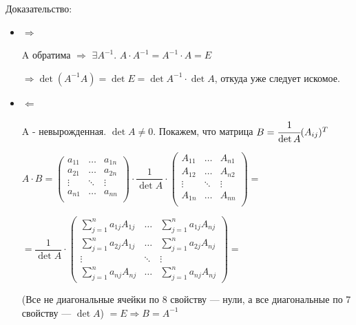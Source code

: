 \documentclass[twoside]{book}
\begin{document}
Доказательство:
\begin{itemize}
    \item \(\Rightarrow\)

          A обратима \(\Rightarrow\) \(\exists  A^{-1}\). \( A \cdot    A^{-1}  =  A^{-1} \cdot A = E \)

          \(\Rightarrow \det( A^{-1} A) =\det E = \det A^{-1} \cdot \det A \), откуда уже следует искомое.

    \item \(\Leftarrow\)

          A - невырожденная. \(\det A \neq 0 \). Покажем, что матрица  \(B=\cfrac{1}{\det A} (A_{ij})^T\)



          \(A \cdot B = \begin{pmatrix}
              a_{11} & \ldots & a_{1n} \\
              a_{21} & \ldots & a_{2n} \\
              \vdots & \ddots & \vdots \\
              a_{n1} & \ldots & a_{nn} \\
          \end{pmatrix} \cdot
          \dfrac{1}{\det A} \cdot \begin{pmatrix}
              A_{11} & \ldots & A_{n1} \\
              A_{12} & \ldots & A_{n2} \\
              \vdots & \ddots & \vdots \\
              A_{1n} & \ldots & A_{nn} \\
          \end{pmatrix} = \)

          \(= \dfrac{1}{\det A} \cdot
          \begin{pmatrix}
              \sum\limits_{j = 1}^{n} a_{1j} A_{1j} & \ldots & \sum\limits_{j = 1}^{n} a_{1j} A_{nj} \\
              \sum\limits_{j = 1}^{n} a_{2j} A_{1j} & \ldots & \sum\limits_{j = 1}^{n} a_{2j} A_{nj} \\
              \vdots                                & \ddots & \vdots                                \\
              \sum\limits_{j = 1}^{n} a_{nj} A_{nj} & \ldots & \sum\limits_{j = 1}^{n} a_{nj} A_{nj}
          \end{pmatrix} =\)

          (Все не диагональные ячейки по 8 свойству --- нули, а все диагональные по 7 свойству --- \(\det A\)) \(= E \Rightarrow B = A^{-1}\)
\end{itemize}
\end{document}
